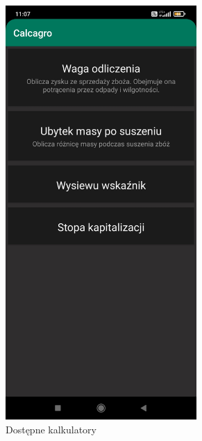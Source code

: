 \documentclass[a4paper,12pt,oneside]{book}
\begin{document}
	\begin{figure}[H]
		\centering
		\begin{subfigure}{.5\textwidth}
			\centering
			\includegraphics[width=0.8\textwidth]{grafika/calc_0.jpg}
			\caption{Dostępne kalkulatory}
		\end{subfigure}%
		\begin{subfigure}{.5\textwidth}
			\centering

\end{subfigure}
\end{figure}
\end{document}
